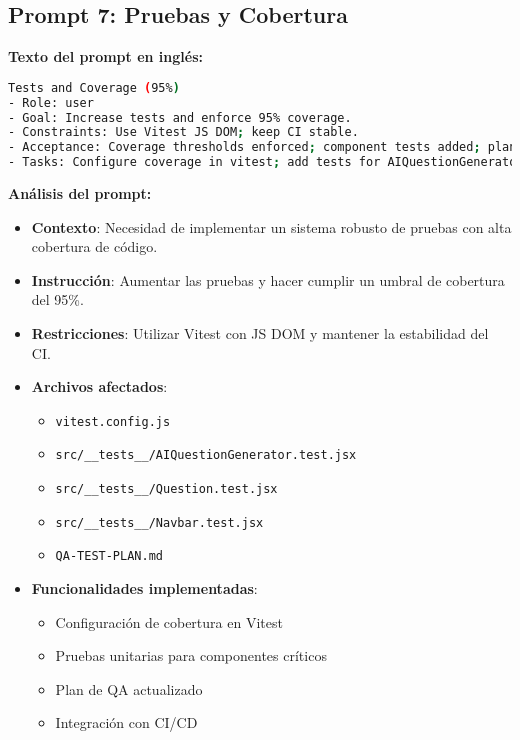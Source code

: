 \documentclass[12pt,a4paper]{article}
\begin{document}
\subsection{Prompt 7: Pruebas y Cobertura}

\textbf{Texto del prompt en inglés:}
\begin{lstlisting}[language=bash]
Tests and Coverage (95%)
- Role: user
- Goal: Increase tests and enforce 95% coverage.
- Constraints: Use Vitest JS DOM; keep CI stable.
- Acceptance: Coverage thresholds enforced; component tests added; plan updated.
- Tasks: Configure coverage in vitest; add tests for AIQuestionGenerator, Question, Navbar; update QA plan.
\end{lstlisting}

\textbf{Análisis del prompt:}
\begin{itemize}
    \item \textbf{Contexto}: Necesidad de implementar un sistema robusto de pruebas con alta cobertura de código.
    
    \item \textbf{Instrucción}: Aumentar las pruebas y hacer cumplir un umbral de cobertura del 95\%.
    
    \item \textbf{Restricciones}: Utilizar Vitest con JS DOM y mantener la estabilidad del CI.
    
    \item \textbf{Archivos afectados}:
    \begin{itemize}
        \item \texttt{vitest.config.js}
        \item \texttt{src/__tests__/AIQuestionGenerator.test.jsx}
        \item \texttt{src/__tests__/Question.test.jsx}
        \item \texttt{src/__tests__/Navbar.test.jsx}
        \item \texttt{QA-TEST-PLAN.md}
    \end{itemize}
    
    \item \textbf{Funcionalidades implementadas}:
    \begin{itemize}
        \item Configuración de cobertura en Vitest
        \item Pruebas unitarias para componentes críticos
        \item Plan de QA actualizado
        \item Integración con CI/CD
    \end{itemize}
\end{itemize}
\end{document}

